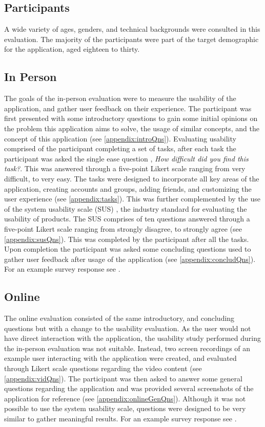 \subsection*{Participants}
A wide variety of ages, genders, and technical backgrounds were consulted in this evaluation. The majority of the participants were part of the target demographic for the application, aged eighteen to thirty. 

\subsection{In Person}
The goals of the in-person evaluation were to measure the usability of the application, and gather user feedback on their experience. The participant was first presented with some introductory questions to gain some initial opinions on the problem this application aims to solve, the usage of similar concepts, and the concept of this application (see \ref{appendix:introQns}).
Evaluating usability comprised of the participant completing a set of tasks, after each task the participant was asked the single ease question \cite{seq}, \textit{How difficult did you find this task?}. This was answered through a five-point Likert scale ranging from very difficult, to very easy. The tasks were designed to incorporate all key areas of the application, creating accounts and groups, adding friends, and customizing the user experience (see \ref{appendix:tasks}). This was further complemented by the use of the system usability scale (SUS) \cite{sus}, the industry standard for evaluating the usability of products. The SUS comprises of ten questions answered through a five-point Likert scale ranging from strongly disagree, to strongly agree (see \ref{appendix:susQns}). This was completed by the participant after all the tasks. Upon completion the participant was asked some concluding questions used to gather user feedback after usage of the application (see \ref{appendix:concludQns}). 
For an example survey response see \cite{evalRespWApp}.

\subsection{Online}
The online evaluation consisted of the same introductory, and concluding questions but with a change to the usability evaluation. As the user would not have direct interaction with the application, the usability study performed during the in-person evaluation was not suitable. Instead, two screen recordings of an example user interacting with the application were created, and evaluated through Likert scale questions regarding the video content (see \ref{appendix:vidQns}). The participant was then asked to answer some general questions regarding the application and was provided several screenshots of the application for reference (see \ref{appendix:onlineGenQns}). Although it was not possible to use the system usability scale, questions were designed to be very similar to gather meaningful results. For an example survey response see \cite{evalRespNoApp}. 

